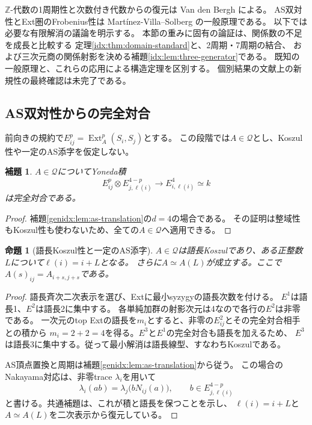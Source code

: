 \documentclass[11pt,a4paper]{ltjsarticle}
\newtheorem{proposition}[theorem]{命題}
\newtheorem{lemma}[theorem]{補題}
\theoremstyle{definition}
\newcommand{\Ext}{\operatorname{Ext}}
\begin{document}
$\mathbb Z$-代数の1周期性と次数付き代数からの復元は
Van den Bergh \cite[Lemma 3.4]{VdB}による。
AS双対性とExt圏のFrobenius性は
Mart\'inez-Villa--Solberg \cite[Lemma 6.1(b), Theorem 6.2]{MVS}の一般原理である。
以下では必要な有限解消の議論を明示する。
本節の重みに固有の論証は、関係数の不足を成長と比較する
定理\ref{idx:thm:domain-standard}と、2周期・7周期の結合、
および三次元商の関係射影を決める補題\ref{idx:lem:three-generator}である。
既知の一般原理と、これらの応用による構造定理を区別する。
個別結果の文献上の新規性の最終確認は未完了である。

\subsection{AS双対性からの完全対合}
前向きの規約で$E_{ij}^p=\Ext_A^p(S_i,S_j)$とする。
この段階では$A\in\mathcal Q$とし、Koszul性や一定のAS添字を仮定しない。

\begin{lemma}\label{idx:lem:frobenius}
$A\in\mathcal Q$についてYoneda積
\[
E_{ij}^p\otimes E_{j,\ell(i)}^{4-p}\longrightarrow E_{i,\ell(i)}^4\simeq k
\]
は完全対合である。
\end{lemma}
\begin{proof}
補題\ref{genidx:lem:as-translation}の$d=4$の場合である。
その証明は整域性もKoszul性も使わないため、全ての$A\in\mathcal Q$へ適用できる。
\end{proof}

\begin{proposition}[語長Koszul性と一定のAS添字]\label{idx:lem:duality-period}
$A\in\mathcal Q$は語長Koszulであり、ある正整数$L$について$\ell(i)=i+L$となる。
さらに$A\simeq A(L)$が成立する。ここで$A(s)_{ij}=A_{i+s,j+s}$である。
\end{proposition}
\begin{proof}
語長斉次二次表示を選び、Extに最小syzygyの語長次数を付ける。
$E^1$は語長1、$E^2$は語長2に集中する。
各単純加群の射影次元は4なので各行の$E^2$は非零である。
一次元のtop Extの語長を$m_i$とすると、非零の$E^2_{ij}$とその完全対合相手との積から
$m_i=2+2=4$を得る。$E^3$と$E^1$の完全対合も語長を加えるため、
$E^3$は語長3に集中する。従って最小解消は語長線型、すなわちKoszulである。

AS頂点置換と周期は補題\ref{genidx:lem:as-translation}から従う。
この場合のNakayama対応は、非零trace $\lambda_i$を用いて
\begin{equation}\label{idx:eq:nakayama}
 \lambda_i(ab)=\lambda_j\bigl(bN_{ij}(a)\bigr),
 \qquad b\in E^{4-p}_{j,\ell(i)}
\end{equation}
と書ける。共通補題は、これが積と語長を保つことを示し、
$\ell(i)=i+L$と$A\simeq A(L)$を二次表示から復元している。
\end{proof}
\end{document}
